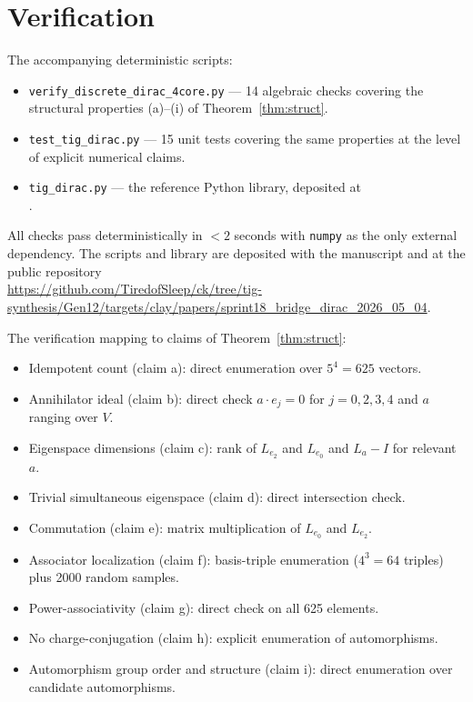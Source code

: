 \documentclass[11pt,reqno]{amsart}
\theoremstyle{plain}
\theoremstyle{definition}
\theoremstyle{remark}
\begin{document}
\section{Verification}
\label{sec:verification}

The accompanying deterministic scripts:

\begin{itemize}
\item \texttt{verify\_discrete\_dirac\_4core.py} --- 14 algebraic checks covering the structural properties (a)--(i) of Theorem~\ref{thm:struct}.
\item \texttt{test\_tig\_dirac.py} --- 15 unit tests covering the same properties at the level of explicit numerical claims.
\item \texttt{tig\_dirac.py} --- the reference Python library, deposited at\\.
\end{itemize}

All checks pass deterministically in $< 2$ seconds with \texttt{numpy} as the only external dependency. The scripts and library are deposited with the manuscript and at the public repository\\\url{https://github.com/TiredofSleep/ck/tree/tig-synthesis/Gen12/targets/clay/papers/sprint18_bridge_dirac_2026_05_04}.

The verification mapping to claims of Theorem~\ref{thm:struct}:

\begin{itemize}
\item Idempotent count (claim a): direct enumeration over $5^4 = 625$ vectors.
\item Annihilator ideal (claim b): direct check $a \cdot e_j = 0$ for $j = 0, 2, 3, 4$ and $a$ ranging over $V$.
\item Eigenspace dimensions (claim c): rank of $L_{e_2}$ and $L_{e_0}$ and $L_a - I$ for relevant $a$.
\item Trivial simultaneous eigenspace (claim d): direct intersection check.
\item Commutation (claim e): matrix multiplication of $L_{e_0}$ and $L_{e_2}$.
\item Associator localization (claim f): basis-triple enumeration ($4^3 = 64$ triples) plus 2000 random samples.
\item Power-associativity (claim g): direct check on all 625 elements.
\item No charge-conjugation (claim h): explicit enumeration of automorphisms.
\item Automorphism group order and structure (claim i): direct enumeration over candidate automorphisms.
\end{itemize}
\end{document}
